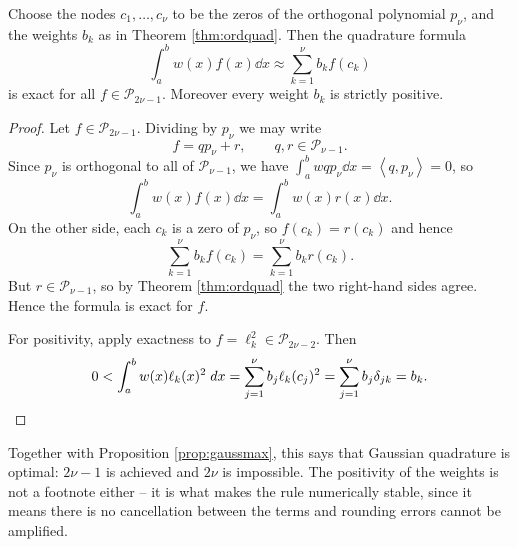 \documentclass[a4paper]{scrartcl}
\newcommand{\ip}[2]{\left\langle #1, #2 \right\rangle}
\newcommand{\Pn}[1]{\mathcal{P}_{#1}}
\begin{document}
\begin{theorem}\label{thm:gauss}
  Choose the nodes $c_1, \dots, c_\nu$ to be the zeros of the orthogonal polynomial $p_\nu$, and the weights $b_k$ as in Theorem \ref{thm:ordquad}. Then the quadrature formula
  $$
  \int_a^b w(x)f(x)\dd x \approx \sum_{k=1}^\nu b_k f(c_k)
  $$
  is exact for all $f \in \Pn{2\nu - 1}$. Moreover every weight $b_k$ is strictly positive.
\end{theorem}
\begin{proof}
  Let $f \in \Pn{2\nu-1}$. Dividing by $p_\nu$ we may write
  $$
  f = qp_\nu + r, \qquad q, r \in \Pn{\nu-1}.
  $$
  Since $p_\nu$ is orthogonal to all of $\Pn{\nu-1}$, we have $\int_a^b w q p_\nu \dd x = \ip{q}{p_\nu} = 0$, so
  $$
  \int_a^b w(x)f(x)\dd x = \int_a^b w(x)r(x)\dd x .
  $$
  On the other side, each $c_k$ is a zero of $p_\nu$, so $f(c_k) = r(c_k)$ and hence
  $$
  \sum_{k=1}^\nu b_k f(c_k) = \sum_{k=1}^\nu b_k r(c_k).
  $$
  But $r \in \Pn{\nu - 1}$, so by Theorem \ref{thm:ordquad} the two right-hand sides agree. Hence the formula is exact for $f$.

  For positivity, apply exactness to $f = \ell_k^2 \in \Pn{2\nu-2}$. Then
  $$
  0 < \int_a^b w(x)\ell_k(x)^2 \; d x = \sum_{j=1}^\nu b_j \ell_k(c_j)^2 = \sum_{j=1}^\nu b_j \delta_{jk} = b_k. \qedhere
  $$
\end{proof}

Together with Proposition \ref{prop:gaussmax}, this says that Gaussian quadrature is optimal: $2\nu - 1$ is achieved and $2\nu$ is impossible. The positivity of the weights is not a footnote either -- it is what makes the rule numerically stable, since it means there is no cancellation between the terms and rounding errors cannot be amplified.
\end{document}

